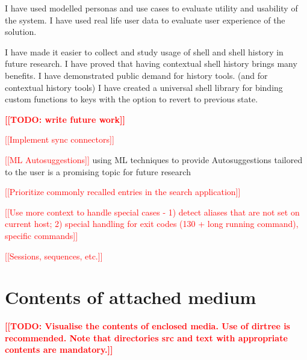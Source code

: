 \documentclass[thesis=M,english]{FITthesis}[2012/10/20]
\newcommand{\todotext}[1]{\textcolor{red}{\textbf{[[#1]]}}}
\newcommand{\redtext}[1]{\textcolor{red}{[[#1]]}}
\begin{document}
\begin{conclusion}
\par I have used modelled personas and use cases to evaluate utility and usability of the system.
I have used real life user data to evaluate user experience of the solution.


I have made it easier to collect and study usage of shell and shell history in future research.
I have proved that having contextual shell history brings many benefits. 
I have demonstrated public demand for history tools. (and for contextual history tools) 
I have created a universal shell library for binding custom functions to keys with the option to revert to previous state. 




\todotext{TODO: write future work}

\redtext{Implement sync connectors}




\redtext{ML Autosuggestions}
using ML techniques to provide Autosuggestions tailored to the user is a promising topic for future research

\redtext{Prioritize commonly recalled entries in the search application}

\redtext{Use more context to handle special cases - 1) detect aliases that are not set on current host; 2) special handling for exit codes (130 + long running command), specific commands}


\redtext{Sessions, sequences, etc.}

\end{conclusion}




\appendix


\chapter{Contents of attached medium}\label{app:SDcontent}

\todotext{TODO: Visualise the contents of enclosed media. Use of dirtree is recommended. Note that directories src and text with appropriate contents are mandatory.}
\end{document}
